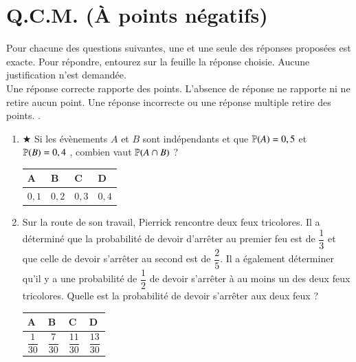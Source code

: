 \documentclass[oneside,12pt]{exam}          %
\begin{document}
\section{Q.C.M. (À points négatifs)}
Pour chacune des questions suivantes, une et une seule des réponses proposées est exacte. Pour répondre, entourez sur la feuille la réponse choisie. Aucune justification n'est demandée. \\
Une réponse correcte rapporte des points. L'absence de réponse ne rapporte ni ne retire aucun point.
Une réponse incorrecte ou une réponse multiple retire des points. . 

\begin{enumerate}[label=\underline{Question \no\arabic*} :  , leftmargin=* , itemsep=1mm]
	\item $\bigstar$ Si les évènements $A$ et $B$ sont indépendants et que ${\mathbb P}(A) = 0,5$  et ${\mathbb P}(B) = 0,4$ , combien vaut  ${\mathbb P}(A \cap B)$ ?
	
		\hspace{\linewidth-\textwidth}
		\renewcommand{\arraystretch}{1.5}
		\begin{tabular}{| P{0.22\textwidth} | P{0.22\textwidth} | P{0.22\textwidth} | P{0.22\textwidth} |} \hline
			A & B & C & D \\ \hline
			$0,1$ & $0,2$ & $0,3$  & $0,4$ \\ \hline
		\end{tabular}
		
	\item Sur la route de son travail, Pierrick rencontre deux feux tricolores. Il a déterminé que la probabilité de devoir d'arrêter au premier feu est de $\dfrac{1}{3}$ et que celle de devoir s'arrêter au second est de $\dfrac{2}{5}$. Il a également déterminer qu'il y a une probabilité de $\dfrac{1}{2}$ de devoir s'arrêter à au moins un des deux feux tricolores. Quelle est la probabilité de devoir s'arrêter aux deux feux ?
	
		\hspace{\linewidth-\textwidth}
		\renewcommand{\arraystretch}{2}
		\begin{tabular}{| P{0.22\textwidth} | P{0.22\textwidth} | P{0.22\textwidth} | P{0.22\textwidth} |} \hline
			A & B & C & D \\ \hline
			$\dfrac{1}{30}$ & $\dfrac{7}{30}$ & $\dfrac{11}{30}$ & $\dfrac{13}{30}$ \\ \hline
		\end{tabular}
		
\end{enumerate}
\end{document}
